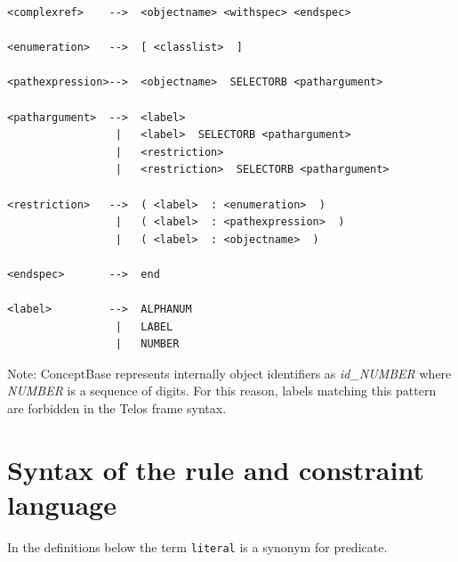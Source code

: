 {\begin{verbatim}
<complexref>    -->  <objectname> <withspec> <endspec>

<enumeration>   -->  [ <classlist>  ]

<pathexpression>-->  <objectname>  SELECTORB <pathargument>

<pathargument>  -->  <label>
                 |   <label>  SELECTORB <pathargument>
                 |   <restriction>
                 |   <restriction>  SELECTORB <pathargument>

<restriction>   -->  ( <label>  : <enumeration>  )
                 |   ( <label>  : <pathexpression>  )
                 |   ( <label>  : <objectname>  )

<endspec>       -->  end

<label>         -->  ALPHANUM
                 |   LABEL
                 |   NUMBER

\end{verbatim}
}

Note: ConceptBase represents internally object identifiers as {\em id\_NUMBER\/} where
{\em NUMBER\/} is a sequence of digits. For this reason, labels matching this
pattern are forbidden in the Telos frame syntax.




\section{Syntax of the rule and constraint language}
\label{sec:assertion language}

In the definitions below the term {\tt literal} is a synonym for predicate.

